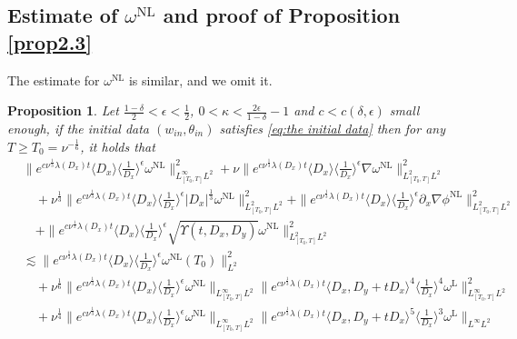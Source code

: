 \documentclass[reqno, 12pt]{amsart} %
\theoremstyle{plain} %
\newtheorem{Prop}[Thm]{Proposition}
\theoremstyle{definition}
\theoremstyle{remark}
\numberwithin{equation}{section} %
\begin{document}
	\subsection{Estimate of $\omega^{\mathrm{NL}}$ and proof of Proposition \ref{prop2.3}}
	The estimate for $\omega^{\mathrm{NL}}$ is similar, and we omit it.
	\begin{Prop} \label{lem:est of wnl}
		Let $\frac{1-\delta}{2}<\epsilon<\frac{1}{2}$, $0<\kappa<\frac{2\epsilon}{1-\delta}-1$ and $c<c(\delta,\epsilon)$ small enough, if the initial data $(w_{in}, \theta_{in})$ satisfies \eqref{eq:the initial data} then for any $  T \geq T_{0} = \nu^{-\frac{1}{6}} $, it holds that
		\footnotesize{	\begin{align*}
				& \| e^{c \nu^{\frac{1}{3}} \lambda\left(D_x\right) t}\langle D_x\rangle\langle\frac{1}{D_x}\rangle^\epsilon \omega^{\mathrm{NL}}\|_{L_{[T_0, T]}^\infty L^2}^2+\nu\|e^{c \nu^{\frac{1}{3}} \lambda\left(D_x\right) t}\langle D_x\rangle\langle\frac{1}{D_x}\rangle^\epsilon \nabla \omega^{\mathrm{NL}}\|_{L_{[T_0, T]}^2L^2}^2 \\
				& \quad+ \nu^{\frac{1}{3}}\|e^{c \nu^{\frac{1}{3}} \lambda\left(D_x\right) t}\langle D_x\rangle\langle\frac{1}{D_x}\rangle^\epsilon\left|D_x\right|^{\frac{1}{3}}  \omega^{\mathrm{NL}}\|_{L_{[T_0, T]}^2 L^2}^2  + \|e^{c \nu^{\frac{1}{3}} \lambda\left(D_x\right) t}\langle D_x\rangle\langle\frac{1}{D_x}\rangle^\epsilon \partial_x \nabla \phi^{\mathrm{NL}}\|_{L_{[T_0, T]}^2 L^2}^2
				\\
				& \quad+\|e^{c \nu^{\frac{1}{3}} \lambda\left(D_x\right) t}\langle D_x\rangle\langle\frac{1}{D_x}\rangle^\epsilon \sqrt{\Upsilon\left(t, D_x, D_y\right)} \omega^{\mathrm{NL}}\|_{L_{[T_0, T]}^2 L^2}^2 \\
				&\lesssim  \| e^{c \nu^{\frac{1}{3}} \lambda\left(D_x\right) t}\langle D_x\rangle\langle\frac{1}{D_x}\rangle^\epsilon \omega^{\mathrm{NL}} (T_0)\|_{ L^2}^2\\
				&\quad+\nu^{\frac{1}{6}}  \|e^{c \nu^{\frac{1}{3}} \lambda\left(D_x\right) t}\langle D_x\rangle  \langle \frac{1}{D_x}\rangle^\epsilon \omega^{\mathrm{NL}}\|_{L_{[T_0, T]}^\infty L^2}    \|e^{c \nu^{\frac{1}{3}} \lambda\left(D_x\right) t}\langle D_x, D_y + tD_x\rangle^4\langle\frac{1}{D_x}\rangle^4 \omega^{\mathrm{L}} \|_{L_{[T_0, T]}^\infty L^2}^2 \\
				&\quad + \nu^{\frac{1}{4}} \|e^{c \nu^{\frac{1}{3}} \lambda\left(D_x\right) t}\langle D_x\rangle  \langle \frac{1}{D_x}\rangle^\epsilon \omega^{\mathrm{NL}}\|_{L_{[T_0, T]}^\infty L^2}    \|e^{c \nu^{\frac{1}{3}} \lambda\left(D_x\right) t}\langle D_x, D_y + tD_x\rangle^ 5 \langle\frac{1}{D_x}\rangle^3 \omega^{\mathrm{L}} \|_{L^\infty L^2} \\

\end{align*}}
\end{Prop}
\end{document}

